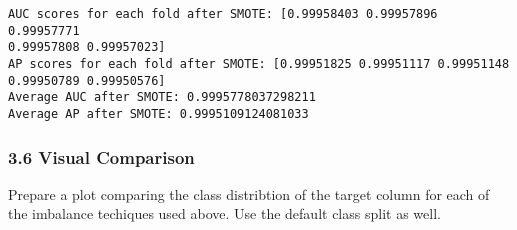 \documentclass[11pt]{article}
\begin{document}
    \begin{Verbatim}[commandchars=\\\{\}]
AUC scores for each fold after SMOTE: [0.99958403 0.99957896 0.99957771
0.99957808 0.99957023]
AP scores for each fold after SMOTE: [0.99951825 0.99951117 0.99951148
0.99950789 0.99950576]
Average AUC after SMOTE: 0.9995778037298211
Average AP after SMOTE: 0.9995109124081033
    \end{Verbatim}

    \hypertarget{visual-comparison}{%
\subsubsection{3.6 Visual Comparison}\label{visual-comparison}}

Prepare a plot comparing the class distribtion of the target column for
each of the imbalance techiques used above. Use the default class split
as well.
\end{document}
